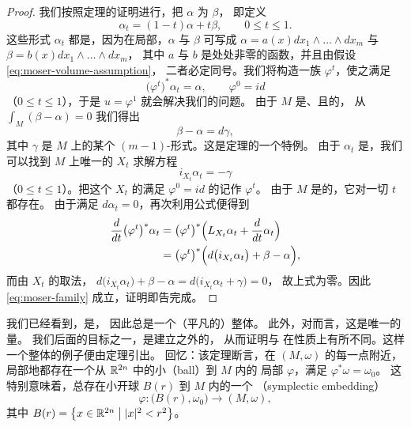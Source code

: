\begin{proof}
我们按照\trDarboux{}定理的证明进行，把\trVolumeForm{} $\alpha$ \trDeformation{}为 $\beta$，%
即定义
\[
\alpha_t=(1-t)\alpha+t\beta,\qquad 0\le t\le1.
\]
这些形式 $\alpha_t$ 都是\trVolumeForm，因为在局部，$\alpha$ 与 $\beta$%
可写成 $\alpha=a(x)dx_1\wedge\dots\wedge dx_m$ 与 $\beta=b(x)dx_1\wedge\dots\wedge dx_m$，%
其中 $a$ 与 $b$ 是处处非零的\trSmooth{}函数，并且由假设 \eqref{eq:moser-volume-assumption}，%
二者必定同号。我们将构造一族\trDiffeomorphism{} $\varphi^{t}$，使之满足
\begin{equation}\label{eq:moser-family}
\bigl(\varphi^{t}\bigr)^{*}\alpha_t=\alpha,\qquad \varphi^{0}=id
\end{equation}
（$0\le t\le1$），于是\trDiffeomorphism{} $u=\varphi^{1}$ 就会解决我们的问题。%
由于 $M$ 是\trCompact、\trConnected{}且\trOriented{}的，%
从 $\int_{M}(\beta-\alpha)=0$ 我们得出
\begin{equation}\label{eq:beta-alpha-exact}
\beta-\alpha=d\gamma,
\end{equation}
其中 $\gamma$ 是 $M$ 上的某个 $(m-1)$-形式。这是\trDeRham{}定理的一个特例。%
由于 $\alpha_t$ 是\trVolumeForm，我们可以找到 $M$ 上唯一的\trTimeDependent\trVectorField{} $X_t$%
求解\trLinear{}方程
\[
i_{X_t}\alpha_t=-\gamma
\]
（$0\le t\le1$）。把这个\trVectorField{} $X_t$ 的满足 $\varphi^{0}=id$ 的\trFlow{}记作 $\varphi^{t}$。%
由于 $M$ 是\trCompact{}的，它对一切 $t$ 都存在。%
由于\trVolumeForm{}满足 $d\alpha_t=0$，再次利用\trCartan{}公式便得到
\begin{align*}
\frac{d}{dt}\bigl(\varphi^{t}\bigr)^{*}\alpha_t
 &= \bigl(\varphi^{t}\bigr)^{*}\Bigl(L_{X_t}\alpha_t+\frac{d}{dt}\alpha_t\Bigr)\\
 &= \bigl(\varphi^{t}\bigr)^{*}\Bigl(d\bigl(i_{X_t}\alpha_t\bigr)+\beta-\alpha\Bigr),
\end{align*}
而由\trVectorField{} $X_t$ 的取法，
$d\bigl(i_{X_t}\alpha_t\bigr)+\beta-\alpha=d\bigl(i_{X_t}\alpha_t+\gamma\bigr)=0$，%
故上式为零。因此 \eqref{eq:moser-family} 成立，证明即告完成。
\end{proof}

我们已经看到，\trSymplecticDiffeomorphism{}是\trVolumePreserving\trDiffeomorphism，%
因此总\trVolume{}是一个（平凡的）整体\trSymplecticInvariant。%
此外，对\trVolumePreserving\trDiffeomorphism{}而言，这是唯一的\trInvariant{}量。%
我们后面的目标之一，是建立\trVolume{}之外的\trSymplecticInvariant，%
从而证明\trSymplecticDiffeomorphism{}与\trVolumePreserving\trDiffeomorphism{}%
在性质上有所不同。这样一个整体\trSymplecticInvariant{}的例子便由\trDarboux{}定理引出。%
回忆：该定理断言，在\trSymplecticManifold{} $(M,\omega)$ 的每一点附近，%
局部地都存在一个从 $\mathbb{R}^{2n}$ 中的小\textbf{\trBall}（ball）到 $M$ 内的%
局部\trDiffeomorphism{} $\varphi$，满足 $\varphi^{*}\omega=\omega_0$。%
这特别意味着，总存在小开球 $B(r)$ 到 $M$ 内的一个%
\textbf{\trSymplecticEmbedding}（symplectic embedding）
\[
\varphi:\bigl(B(r),\omega_0\bigr)\to(M,\omega),
\]
其中 $B(r)=\bigl\{x\in\mathbb{R}^{2n}\bigm||x|^{2}<r^{2}\bigr\}$。

